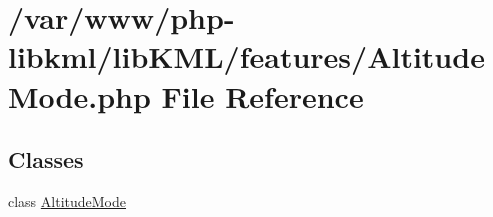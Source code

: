 \hypertarget{AltitudeMode_8php}{
\section{/var/www/php-\/libkml/libKML/features/AltitudeMode.php File Reference}
\label{d0/dd0/AltitudeMode_8php}
}
\subsection*{Classes}
\begin{DoxyCompactItemize}
\item 
class \hyperlink{classAltitudeMode}{AltitudeMode}
\end{DoxyCompactItemize}
